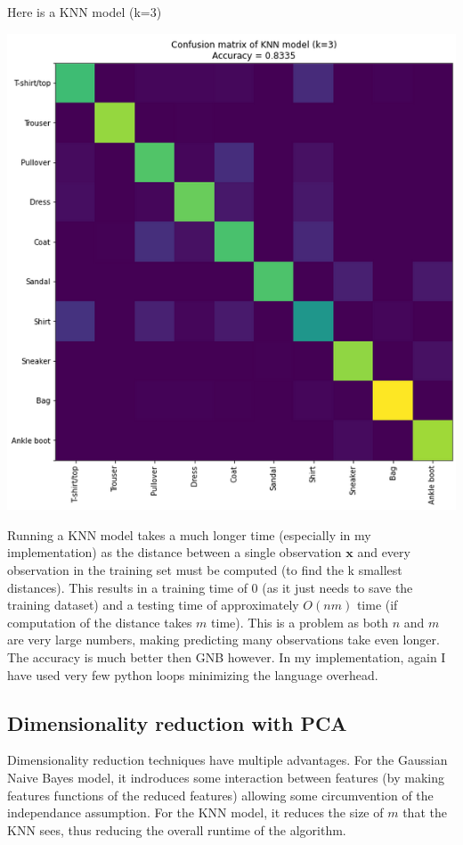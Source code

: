 \documentclass[11pt]{article}
\begin{document}
Here is a KNN model (k=3)

\begin{center}
\includegraphics[width=.9\linewidth]{.images/Experimentation_and_Results/2020-10-21_20-06-57_screenshot.png}
\end{center}

Running a KNN model takes a much longer time (especially in my implementation) as the distance between a single observation \(\mathbf x\) and every observation in the training set must be computed (to find the k smallest distances). This results in a training time of 0 (as it just needs to save the training dataset) and a testing time of approximately \(O\left(nm\right)\) time (if computation of the distance takes \(m\) time). This is a problem as both \(n\) and \(m\) are very large numbers, making predicting many observations take even longer. The accuracy is much better then GNB however. In my implementation, again I have used very few python loops minimizing the language overhead.

\subsection{Dimensionality reduction with PCA}
\label{sec:orgfa782f9}

Dimensionality reduction techniques have multiple advantages. For the Gaussian Naive Bayes model, it indroduces some interaction between features (by making features functions of the reduced features) allowing some circumvention of the independance assumption. For the KNN model, it reduces the size of \(m\) that the KNN sees, thus reducing the overall runtime of the algorithm.
\end{document}
